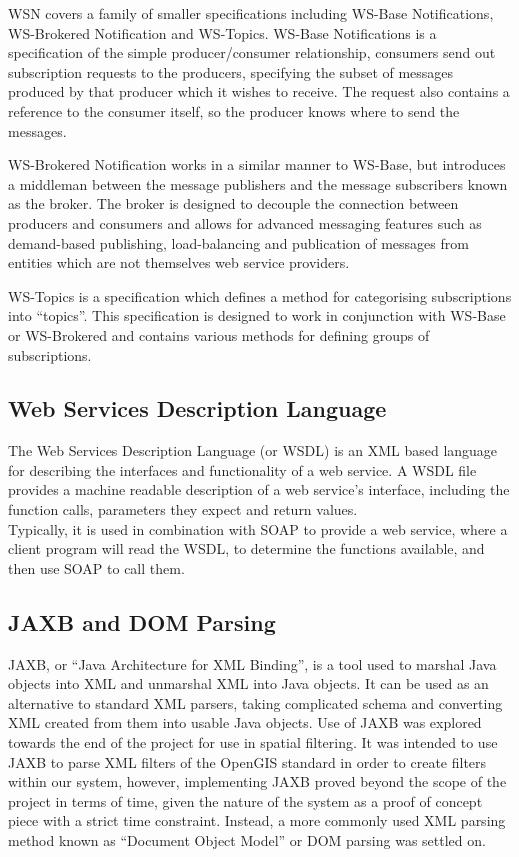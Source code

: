 \documentclass[a4paper, 12pt, twoside]{article}
\begin{document}
WSN covers a family of smaller specifications including WS-Base Notifications, WS-Brokered Notification and WS-Topics. WS-Base Notifications is a specification of the simple producer/consumer relationship, consumers send out subscription requests to the producers, specifying the subset of messages produced by that producer which it wishes to receive. The request also contains a reference to the consumer itself, so the producer knows where to send the messages.

WS-Brokered Notification works in a similar manner to WS-Base, but introduces a middleman between the message publishers and the message subscribers known as the broker. The broker is designed to decouple the connection between producers and consumers and allows for advanced messaging features such as demand-based publishing, load-balancing and publication of messages from entities which are not themselves web service providers.

WS-Topics is a specification which defines a method for categorising subscriptions into ``topics''. This specification is designed to work in conjunction with WS-Base or WS-Brokered and contains various methods for defining groups of subscriptions.

\subsection{Web Services Description Language}
\label{sec:bg_wsdl}

The Web Services Description Language (or WSDL) is an XML based language for describing the interfaces and functionality of a web service. A WSDL file provides a machine readable description of a web service's interface, including the function calls, parameters they expect and return values.\\
Typically, it is used in combination with SOAP to provide a web service, where a client program will read the WSDL, to determine the functions available, and then use SOAP to call them.

\subsection{JAXB and DOM Parsing}
\label{sec:bg_parsing}

JAXB, or ``Java Architecture for XML Binding'', is a tool used to marshal Java objects into XML and unmarshal XML into Java objects. It can be used as an alternative to standard XML parsers, taking complicated schema and converting XML created from them into usable Java objects. Use of JAXB was explored towards the end of the project for use in spatial filtering. It was intended to use JAXB to parse XML filters of the OpenGIS standard in order to create filters within our system, however, implementing JAXB proved beyond the scope of the project in terms of time, given the nature of the system as a proof of concept piece with a strict time constraint. Instead, a more commonly used XML parsing method known as ``Document Object Model'' or DOM parsing was settled on.
\end{document}
